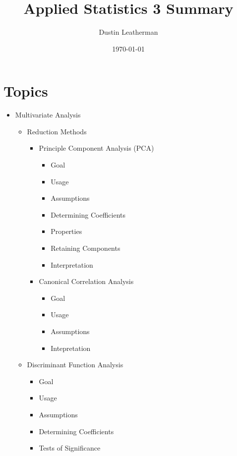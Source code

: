\documentclass[11pt]{article}
\author{Dustin Leatherman}
\date{\today}
\title{Applied Statistics 3 Summary}
\begin{document}
\maketitle
\tableofcontents


\section{Topics}
\label{sec:orgb661e38}
\begin{itemize}
\item Multivariate Analysis

\begin{itemize}
\item Reduction Methods

\begin{itemize}
\item Principle Component Analysis (PCA)

\begin{itemize}
\item Goal
\item Usage
\item Assumptions
\item Determining Coefficients
\item Properties
\item Retaining Components
\item Interpretation
\end{itemize}

\item Canonical Correlation Analysis

\begin{itemize}
\item Goal
\item Usage
\item Assumptions
\item Intepretation
\end{itemize}
\end{itemize}

\item Discriminant Function Analysis

\begin{itemize}
\item Goal
\item Usage
\item Assumptions
\item Determining Coefficients
\item Tests of Significance
\end{itemize}


\end{itemize}
\end{itemize}
\end{document}
